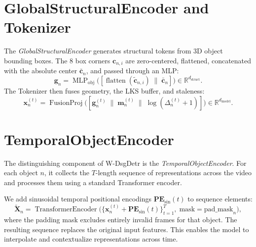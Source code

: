 \documentclass{article}
\newcommand{\mR}{\mathbb{R}}
\newcommand{\op}[1]{\operatorname{#1}}
\newcommand{\mat}[1]{\bm{#1}}
\begin{document}
\section{GlobalStructuralEncoder and Tokenizer}
\label{sec:gse_tok}

The \emph{GlobalStructuralEncoder} generates structural tokens from 3D object bounding boxes. The 8 box corners $\mat{c}_{n,i}$ are zero-centered, flattened, concatenated with the absolute center $\bar{\mat{c}}_n$, and passed through an MLP:
\begin{equation}
    \mat{g}_n = \op{MLP}_{\text{obj}}\bigl([\op{flatten}(\tilde{\mat{c}}_{n,i}) \;\|\; \bar{\mat{c}}_n]\bigr) \in \mR^{d_{\text{struct}}}.
    \label{eq:gse_obj}
\end{equation}
The Tokenizer then fuses geometry, the LKS buffer, and staleness:
\begin{equation}
    \mat{x}_n^{(t)} = \op{FusionProj}\bigl([\mat{g}_n^{(t)} \;\|\; \mat{m}_n^{(t)} \;\|\; \log(\Delta_n^{(t)} + 1)]\bigr) \in \mR^{d_{\text{model}}}.
    \label{eq:tokenizer}
\end{equation}

\section{TemporalObjectEncoder}
\label{sec:toe}

The distinguishing component of W-DsgDetr is the \emph{TemporalObjectEncoder}. For each object $n$, it collects the $T$-length sequence of representations across the video and processes them using a standard Transformer encoder.

We add sinusoidal temporal positional encodings $\mat{PE}_{\text{sin}}(t)$ to sequence elements:
\begin{equation}
    \tilde{\mat{X}}_n = \op{TransformerEncoder}\bigl(\{\mat{x}_n^{(t)} + \mat{PE}_{\text{sin}}(t)\}_{t=1}^T,\; \text{mask}=\text{pad\_mask}_n\bigr),
    \label{eq:toe}
\end{equation}
where the padding mask excludes entirely invalid frames for that object. The resulting sequence replaces the original input features. This enables the model to interpolate and contextualize representations across time.
\end{document}
